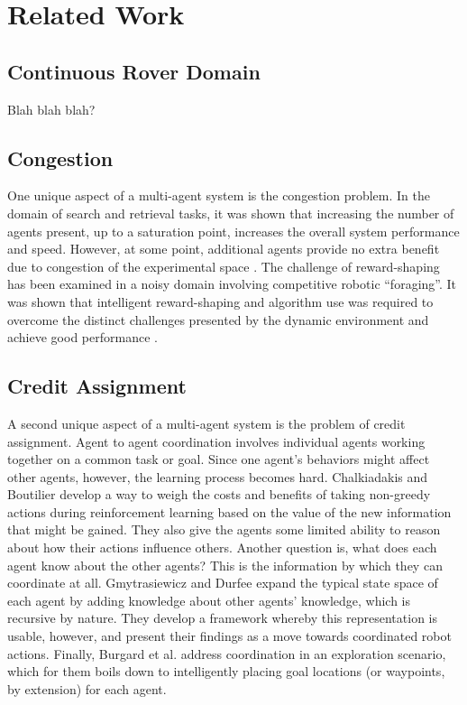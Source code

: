 \documentclass[letterpaper, 10 pt, conference]{ieeeconf}  %
\begin{document}
\section{Related Work}
\subsection{Continuous Rover Domain}
Blah blah blah?

\subsection{Congestion}
One unique aspect of a multi-agent system is the congestion
problem. In the domain of search and retrieval tasks, it was shown
that increasing the number of agents present, up to a saturation
point, increases the overall system performance and speed. However, at
some point, additional agents provide no extra benefit due to
congestion of the experimental space \cite{rybski1998performance}. The challenge of
reward-shaping has been examined in a noisy domain involving
competitive robotic “foraging”. It was shown that intelligent
reward-shaping and algorithm use was required to overcome the distinct
challenges presented by the dynamic environment and achieve good
performance \cite{mataric1997reinforcement}.

\subsection{Credit Assignment}
A second unique aspect of a multi-agent system is the problem of
credit assignment. Agent to agent coordination involves individual
agents working together on a common task or goal.  Since one agent’s
behaviors might affect other agents, however, the learning process
becomes hard. Chalkiadakis and Boutilier \cite{chalkiadakis2003coordination} develop a way to weigh
the costs and benefits of taking non-greedy actions during
reinforcement learning based on the value of the new information that
might be gained. They also give the agents some limited ability to
reason about how their actions influence others. Another question is,
what does each agent know about the other agents? This is the
information by which they can coordinate at all. Gmytrasiewicz and
Durfee \cite{gmytrasiewicz2000rational} expand the typical state space of each agent by adding
knowledge about other agents’ knowledge, which is recursive by
nature. They develop a framework whereby this representation is
usable, however, and present their findings as a move towards
coordinated robot actions. Finally, Burgard et al. \cite{burgard2005coordinated} address
coordination in an exploration scenario, which for them boils down to
intelligently placing goal locations (or waypoints, by extension) for
each agent.
\end{document}

